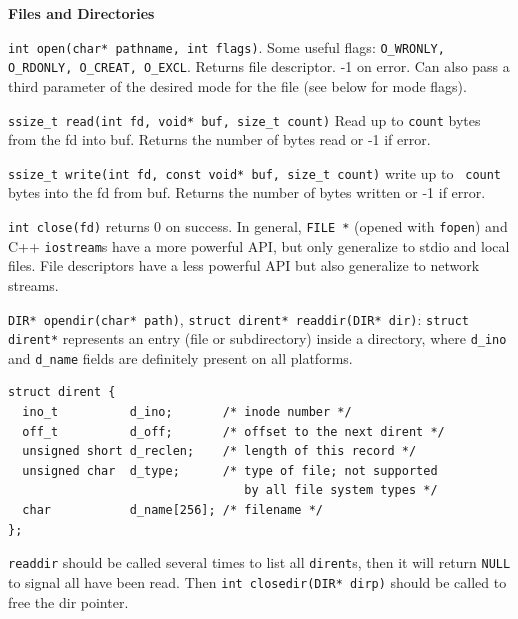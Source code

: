 \documentclass{article}
\begin{document}
\small
\begin{multicols}{2}
  \raggedright
  {\bf Files and Directories}

  {\tt int open(char* pathname, int flags)}. Some useful flags:
  {\tt O\_WRONLY, O\_RDONLY, O\_CREAT, O\_EXCL}. Returns file descriptor. -1 on
  error. Can also pass a third parameter of the desired mode for the file (see
  below for mode flags).

  {\tt ssize\_t read(int fd, void* buf, size\_t count)} Read up to {\tt count}
  bytes from the fd into buf. Returns the number of bytes read or -1 if error.

  {\tt ssize\_t write(int fd, const void* buf, size\_t count)} write up to {\tt
  count} bytes into the fd from buf. Returns the number of bytes written or -1
  if error.

  {\tt int close(fd)} returns 0 on success.
  In general, \texttt{FILE *} (opened with \texttt{fopen}) and C++
  \texttt{iostream}s have a more powerful API, but only generalize to stdio and
  local files. File descriptors have a less powerful API but also generalize to
  network streams.

  {\tt DIR* opendir(char* path)},
  {\tt struct dirent* readdir(DIR* dir)}: \texttt{struct dirent*} represents an
  entry (file or subdirectory) inside a directory, where \texttt{d\_ino} and
  \texttt{d\_name} fields are definitely present on all platforms.
  {\footnotesize
  \begin{verbatim}
struct dirent {
  ino_t          d_ino;       /* inode number */
  off_t          d_off;       /* offset to the next dirent */
  unsigned short d_reclen;    /* length of this record */
  unsigned char  d_type;      /* type of file; not supported
                                 by all file system types */
  char           d_name[256]; /* filename */
};\end{verbatim}}
  \texttt{readdir} should be called several times to list all \texttt{dirent}s,
  then it will return \texttt{NULL} to signal all have been read. Then
  \texttt{int closedir(DIR* dirp)} should be called to free the dir pointer.


\end{multicols}
\end{document}
